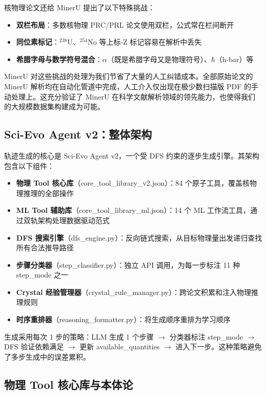\documentclass[12pt,a4paper]{article}
\begin{document}
核物理论文还给 MinerU 提出了以下特殊挑战：

\begin{itemize}
\item \textbf{双栏布局}：多数核物理 PRC/PRL 论文使用双栏，公式常在栏间断开
\item \textbf{同位素标记}：$^{238}$U、$^{254}$No 等上标-Z 标记容易在解析中丢失
\item \textbf{希腊字母与数学符号混合}：$\alpha$（既是希腊字母又是物理符号）、$\hbar$（h-bar）等
\end{itemize}

MinerU 对这些挑战的处理为我们节省了大量的人工纠错成本。全部原始论文的 MinerU 解析均在自动化管道中完成，人工介入仅出现在极少数扫描版 PDF 的手动处理上。这充分验证了 MinerU 在科学文献解析领域的领先能力，也使得我们的大规模数据集构建成为可能。

\subsection{Sci-Evo Agent v2：整体架构}

轨迹生成的核心是 Sci-Evo Agent v2，一个受 DFS 约束的逐步生成引擎。其架构包含以下组件：

\begin{itemize}
\item \textbf{物理 Tool 核心库}（core\_tool\_library\_v2.json）：84 个原子工具，覆盖核物理推理的全部操作
\item \textbf{ML Tool 辅助库}（core\_tool\_library\_ml.json）：14 个 ML 工作流工具，通过双轨架构处理数据驱动范式
\item \textbf{DFS 搜索引擎}（dfs\_engine.py）：反向链式搜索，从目标物理量出发递归查找所有合法推导路径
\item \textbf{步骤分类器}（step\_classifier.py）：独立 API 调用，为每一步标注 11 种 step\_mode 之一
\item \textbf{Crystal 经验管理器}（crystal\_rule\_manager.py）：跨论文积累和注入物理推理规则
\item \textbf{时序重排器}（reasoning\_formatter.py）：将生成顺序重排为学习顺序
\end{itemize}

生成采用每次 1 步的策略：LLM 生成 1 个步骤 $\rightarrow$ 分类器标注 step\_mode $\rightarrow$ DFS 验证依赖满足 $\rightarrow$ 更新 available\_quantities $\rightarrow$ 进入下一步。这种策略避免了多步生成中的误差累积。

\subsection{物理 Tool 核心库与本体论}
\end{document}
